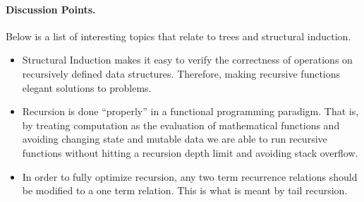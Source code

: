 \documentclass{article}
\begin{document}
\paragraph*{Discussion Points.} Below is a list of interesting topics that relate to trees and structural induction. 
\begin{itemize}
\item	Structural Induction makes it easy to verify the correctness of operations on recursively defined data structures. Therefore, making recursive functions elegant solutions to problems. 
\item	Recursion is done ``properly'' in a functional programming paradigm. That is, by treating computation as the evaluation of mathematical functions and avoiding changing state and mutable data we are able to run recursive functions without hitting a recursion depth limit and avoiding stack overflow. 
\item	In order to fully optimize recursion, any two term recurrence relations should be modified to a one term relation. This is what is meant by tail recursion. 


\end{itemize}
\end{document}
